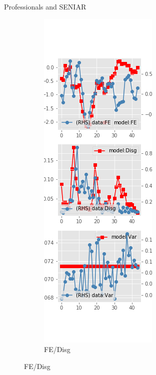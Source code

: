 \documentclass{beamer}
\begin{document}
\begin{frame}{Professionals and SENIAR}
\begin{figure}[ht]
\begin{subfigure}[b]{0.2\textwidth}
		\end{subfigure}
		\hfill
		\begin{subfigure}[b]{0.2\textwidth}
			\caption{FE/Disg}
			\includegraphics[width=\textwidth, height = 0.8\textheight]{figuresDraft/spf_seni_est_diag1.png}

\end{subfigure}
\end{figure}
\end{frame}
\end{document}
